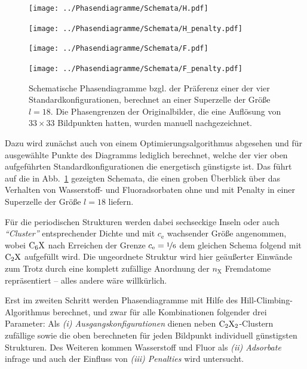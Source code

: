 \documentclass[a4paper, 10pt, twoside, openany]{book} %
\def \nX {n_\mathrm{X}}
\def \cE {c_\mathrm{e}}
\begin{document}
	\begin{figure}
		\begin{minipage}[b]{0.48\textwidth}
			\texttt{[image: ../Phasendiagramme/Schemata/H.pdf]}
		\end{minipage}
		\hfill
		\begin{minipage}[b]{0.48\textwidth}
			\texttt{[image: ../Phasendiagramme/Schemata/H\_penalty.pdf]}
		\end{minipage}
		
		\medskip
		
		\begin{minipage}[b]{0.48\textwidth}
			\texttt{[image: ../Phasendiagramme/Schemata/F.pdf]}
		\end{minipage}
		\hfill
		\begin{minipage}[b]{0.48\textwidth}
			\texttt{[image: ../Phasendiagramme/Schemata/F\_penalty.pdf]}
		\end{minipage}
		\caption[Präferenz einer der vier Standardkonfigurationen]{Schematische Phasendiagramme bzgl. der Präferenz einer der vier Standardkonfigurationen, berechnet an einer Superzelle der Größe $l = 18$. Die Phasengrenzen der Originalbilder, die eine Auflösung von $33 \times 33$ Bildpunkten hatten, wurden manuell nachgezeichnet.}
		\label{Schemata}
	\end{figure}
	Dazu wird zunächst auch von einem Optimierungsalgorithmus abgesehen und für ausgewählte Punkte des Diagramms lediglich berechnet, welche der vier oben aufgeführten Standardkonfigurationen die energetisch günstigste ist. Das führt auf die in Abb.~\ref{Schemata} gezeigten Schemata, die einen groben Überblick über das Verhalten von Wasserstoff- und Fluoradsorbaten ohne und mit Penalty in einer Superzelle der Größe $l = 18$ liefern.
	
	Für die periodischen Strukturen werden dabei sechseckige Inseln oder auch \emph{"`Cluster"'} entsprechender Dichte und mit $\cE$ wachsender Größe angenommen, wobei $\rm C_6X$ nach Erreichen der Grenze $\cE = \nicefrac 1 6$ dem gleichen Schema folgend mit $\rm C_2X$ aufgefüllt wird. Die ungeordnete Struktur wird hier geäußerter Einwände zum Trotz durch eine komplett zufällige Anordnung der $\nX$ Fremdatome repräsentiert -- alles andere wäre willkürlich.
	
	Erst im zweiten Schritt werden Phasendiagramme mit Hilfe des Hill-Climbing-Algorithmus berechnet, und zwar für alle Kombinationen folgender drei Parameter: Als \emph{(i) Ausgangskonfigurationen} dienen neben $\rm C_2X_2$-Clustern zufällige sowie die oben berechneten für jeden Bildpunkt individuell günstigsten Strukturen. Des Weiteren kommen Wasserstoff und Fluor als \emph{(ii) Adsorbate} infrage und auch der Einfluss von \emph{(iii) Penalties} wird untersucht.
	
\end{document}
